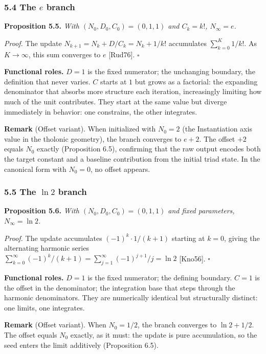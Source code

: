 \documentclass[
  11pt,
  letterpaper,
]{article}
\begin{document}
\subsubsection{\texorpdfstring{5.4 The \(e\)
branch}{5.4 The e branch}}\label{the-e-branch}

\textbf{Proposition 5.5.} \emph{With \((N_0, D_0, C_0) = (0, 1, 1)\) and
\(C_k = k!\), \(N_\infty = e\).}

\emph{Proof.} The update \(N_{k+1} = N_k + D/C_k = N_k + 1/k!\)
accumulates \(\sum_{k=0}^{K} 1/k!\). As \(K \to \infty\), this sum
converges to \(e\) {[}Rud76{]}. \(\square\)

\textbf{Functional roles.} \(D = 1\) is the fixed numerator; the
unchanging boundary, the definition that never varies. \(C\) starts at
\(1\) but grows as a factorial: the expanding denominator that absorbs
more structure each iteration, increasingly limiting how much of the
unit contributes. They start at the same value but diverge immediately
in behavior: one constrains, the other integrates.

\textbf{Remark} (Offset variant). When initialized with \(N_0 = 2\) (the
Instantiation axis value in the tholonic geometry), the branch converges
to \(e + 2\). The offset \(+2\) equals \(N_0\) exactly (Proposition
6.5), confirming that the raw output encodes both the target constant
and a baseline contribution from the initial triad state. In the
canonical form with \(N_0 = 0\), no offset appears.

\subsubsection{\texorpdfstring{5.5 The \(\ln 2\)
branch}{5.5 The \textbackslash ln 2 branch}}\label{the-ln-2-branch}

\textbf{Proposition 5.6.} \emph{With \((N_0, D_0, C_0) = (0, 1, 1)\) and
fixed parameters, \(N_\infty = \ln 2\).}

\emph{Proof.} The update accumulates \((-1)^k \cdot 1/(k+1)\) starting
at \(k = 0\), giving the alternating harmonic series
\(\sum_{k=0}^\infty (-1)^k/(k+1) = \sum_{j=1}^\infty (-1)^{j+1}/j = \ln 2\)
{[}Kno56{]}. \(\square\)

\textbf{Functional roles.} \(D = 1\) is the fixed numerator; the
defining boundary. \(C = 1\) is the offset in the denominator; the
integration base that steps through the harmonic denominators. They are
numerically identical but structurally distinct: one limits, one
integrates.

\textbf{Remark} (Offset variant). When \(N_0 = 1/2\), the branch
converges to \(\ln 2 + 1/2\). The offset equals \(N_0\) exactly, as it
must: the update is pure accumulation, so the seed enters the limit
additively (Proposition 6.5).
\end{document}
